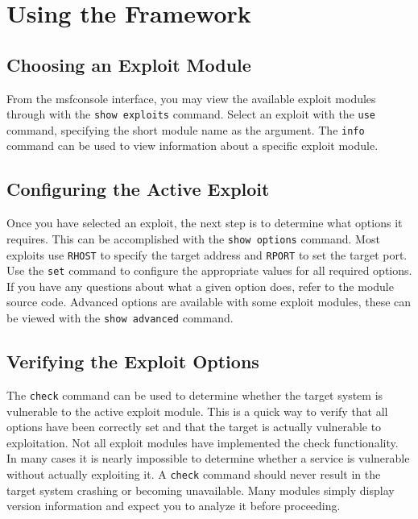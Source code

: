 \documentclass{report}
\begin{document}
\pagebreak

\chapter{Using the Framework}


	\section{Choosing an Exploit Module}
\par
From the msfconsole interface, you may view the available exploit modules
through with the \texttt{show exploits} command. Select an exploit with the
\texttt{use} command, specifying the short module name as the argument. The
\texttt{info} command can be used to view information about a specific exploit module. 


	\section{Configuring the Active Exploit}
\par
Once you have selected an exploit, the next step is to determine what options it
requires. This can be accomplished with the \texttt{show options} command. Most exploits
use \texttt{RHOST} to specify the target address and \texttt{RPORT} to set the target port. Use
the \texttt{set} command to configure the appropriate values for all required options. If
you have any questions about what a given option does, refer to the module
source code. Advanced options are available with some exploit modules, these can
be viewed with the \texttt{show advanced} command. 

	\section{Verifying the Exploit Options}
\par	
The \texttt{check} command can be used to determine whether the target system is
vulnerable to the active exploit module. This is a quick way to verify that all
options have been correctly set and that the target is actually vulnerable to
exploitation. Not all exploit modules have implemented the check functionality.
In many cases it is nearly impossible to determine whether a service is
vulnerable without actually exploiting it. A \texttt{check} command should never result
in the target system crashing or becoming unavailable. Many modules simply
display version information and expect you to analyze it before proceeding.  
\end{document}
